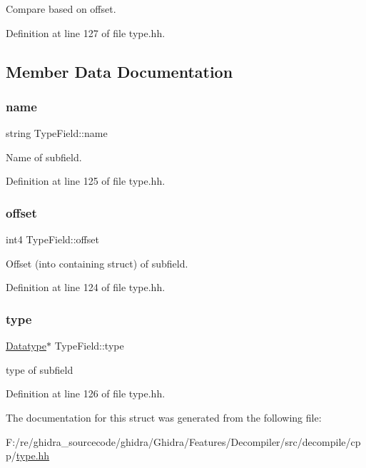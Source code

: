 Compare based on offset. 



Definition at line 127 of file type.\+hh.



\subsection{Member Data Documentation}
\mbox{\label{struct_type_field_a61abd462b68f2dd96a65467121c9901d}} 
\subsubsection{\texorpdfstring{name}{name}}
{\footnotesize\ttfamily string Type\+Field\+::name}



Name of subfield. 



Definition at line 125 of file type.\+hh.

\mbox{\label{struct_type_field_a5b8be5d9b503252bd87ef1038f465ec8}} 
\subsubsection{\texorpdfstring{offset}{offset}}
{\footnotesize\ttfamily int4 Type\+Field\+::offset}



Offset (into containing struct) of subfield. 



Definition at line 124 of file type.\+hh.

\mbox{\label{struct_type_field_a6d0befd0901d67950a1ed085ebdad92c}} 
\subsubsection{\texorpdfstring{type}{type}}
{\footnotesize\ttfamily \mbox{\hyperlink{class_datatype}{Datatype}}$\ast$ Type\+Field\+::type}



type of subfield 



Definition at line 126 of file type.\+hh.



The documentation for this struct was generated from the following file\+:\begin{DoxyCompactItemize}
\item 
F\+:/re/ghidra\+\_\+sourcecode/ghidra/\+Ghidra/\+Features/\+Decompiler/src/decompile/cpp/\mbox{\hyperlink{type_8hh}{type.\+hh}}\end{DoxyCompactItemize}
